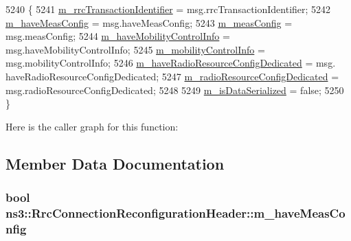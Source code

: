\begin{DoxyCode}
5240 \{
5241   \hyperlink{classns3_1_1RrcConnectionReconfigurationHeader_ae6f276694b1b97f017227127d196cd2a}{m\_rrcTransactionIdentifier} = msg.rrcTransactionIdentifier;
5242   \hyperlink{classns3_1_1RrcConnectionReconfigurationHeader_a274b29c01be85788f4857565cf9e05c5}{m\_haveMeasConfig} = msg.haveMeasConfig;
5243   \hyperlink{classns3_1_1RrcConnectionReconfigurationHeader_a5fd4a46dd4c2fdefd5fdaa4d6f51a198}{m\_measConfig} = msg.measConfig;
5244   \hyperlink{classns3_1_1RrcConnectionReconfigurationHeader_a9028689c10df4671430dbc0179a971bd}{m\_haveMobilityControlInfo} = msg.haveMobilityControlInfo;
5245   \hyperlink{classns3_1_1RrcConnectionReconfigurationHeader_a5fcc1f18f57bf3d669b61cfccc625531}{m\_mobilityControlInfo} = msg.mobilityControlInfo;
5246   \hyperlink{classns3_1_1RrcConnectionReconfigurationHeader_ad160e4e3e27c9795c223fc97f3e69d41}{m\_haveRadioResourceConfigDedicated} = msg.
      haveRadioResourceConfigDedicated;
5247   \hyperlink{classns3_1_1RrcConnectionReconfigurationHeader_a7010bf4b65c2e3aeb25f889bd16ea10f}{m\_radioResourceConfigDedicated} = msg.radioResourceConfigDedicated;
5248 
5249   \hyperlink{classns3_1_1Asn1Header_ae39d42f09e8ec85d8180843625fc92ba}{m\_isDataSerialized} = \textcolor{keyword}{false};
5250 \}
\end{DoxyCode}


Here is the caller graph for this function\+:




\subsection{Member Data Documentation}
\subsubsection[{\texorpdfstring{m\+\_\+have\+Meas\+Config}{m_haveMeasConfig}}]{\setlength{\rightskip}{0pt plus 5cm}bool ns3\+::\+Rrc\+Connection\+Reconfiguration\+Header\+::m\+\_\+have\+Meas\+Config\hspace{0.3cm}{\ttfamily [private]}}\hypertarget{classns3_1_1RrcConnectionReconfigurationHeader_a274b29c01be85788f4857565cf9e05c5}{}\label{classns3_1_1RrcConnectionReconfigurationHeader_a274b29c01be85788f4857565cf9e05c5}
